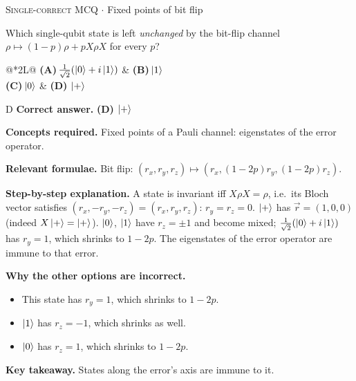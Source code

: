 \documentclass[11pt,a4paper]{article}
\newcommand{\optlabel}[1]{\textbf{(#1)}}
\newcommand{\correctlabel}[1]{\textcolor{okgreen}{\textbf{(#1)}\,\ding{51}}}
\newenvironment{qitem}[1]{\begin{list}{}{\setlength{\leftmargin}{3.3em}\setlength{\labelwidth}{3.1em}%
  \setlength{\labelsep}{0.2em}\setlength{\topsep}{3pt}\setlength{\parsep}{3pt}}\item[\textbf{Q.#1}\hfill]}{\end{list}}
\newcommand{\qsep}{\par\vspace{2pt}{\color{black!15}\hrule}\vspace{4pt}}
\newcommand{\qmeta}[2]{{\footnotesize\color{black!60}\textsc{#1} \;$\cdot$\; #2}\par}
\begin{document}
\begin{qitem}{21}
\qmeta{Single-correct MCQ}{Fixed points of bit flip}
Which single-qubit state is left \emph{unchanged} by the bit-flip channel $\rho \mapsto (1 - p)\rho + pX\rho X$ for every $p$?
\par\smallskip\noindent\begin{tabularx}{\linewidth}{@{}*{2}{L}@{}}
\optlabel{A}\,$\frac{1}{\sqrt2}(\ket0 + i\ket1)$ & \optlabel{B}\,$\ket1$ \\[3pt]
\optlabel{C}\,$\ket0$ & \correctlabel{D}\,$\ket+$
\end{tabularx}
\end{qitem}
\begin{solbox}{D}
\textbf{\color{brand}Correct answer.} \textcolor{okgreen}{\textbf{(D)}} $\ket+$

\textbf{\color{brand}Concepts required.} Fixed points of a Pauli channel: eigenstates of the error operator.

\textbf{\color{brand}Relevant formulae.} Bit flip: $(r_x, r_y, r_z) \mapsto (r_x, (1-2p)r_y, (1-2p)r_z)$.

\textbf{\color{brand}Step-by-step explanation.} A state is invariant iff $X\rho X = \rho$, i.e.\ its Bloch vector satisfies $(r_x, -r_y, -r_z) = (r_x, r_y, r_z)$: $r_y = r_z = 0$.
$\ket+$ has $\vec r = (1, 0, 0)$ (indeed $X\ket+ = \ket+$). $\ket0$, $\ket1$ have $r_z = \pm1$ and become mixed; $\frac{1}{\sqrt2}(\ket0 + i\ket1)$ has
$r_y = 1$, which shrinks to $1 - 2p$. The eigenstates of the error operator are immune to that error.

\textbf{\color{brand}Why the other options are incorrect.}
\begin{itemize}[leftmargin=2.4em, itemsep=1pt, topsep=2pt]
\item[\textbf{(A)}] This state has $r_y = 1$, which shrinks to $1 - 2p$.
\item[\textbf{(B)}] $\ket1$ has $r_z = -1$, which shrinks as well.
\item[\textbf{(C)}] $\ket0$ has $r_z = 1$, which shrinks to $1 - 2p$.
\end{itemize}
\textbf{\color{brand}Key takeaway.} States along the error's axis are immune to it.
\end{solbox}
\qsep
\end{document}
